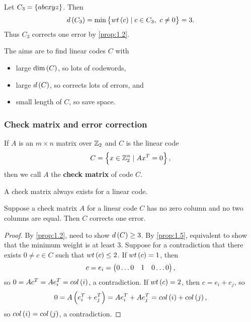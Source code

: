 \begin{example*}
Let $ C_3 = \cbr{abcxyz} $. Then
$$ d\br{C_3} = \min\cbr{wt\br{c} \mid c \in C_3, \ c \ne 0} = 3. $$
Thus $ C_3 $ corrects one error by \ref{prop:1.2}.
\end{example*}

The aims are to find linear codes $ C $ with
\begin{itemize}
\item large $ \dim\br{C} $, so lots of codewords,
\item large $ d\br{C} $, so corrects lots of errors, and
\item small length of $ C $, so save space.
\end{itemize}

\pagebreak

\subsubsection{Check matrix and error correction}

\begin{definition*}
If $ A $ is an $ m \times n $ matrix over $ \mathbb{Z}_2 $ and $ C $ is the linear code
$$ C = \cbr{x \in \Z_2^n \mid Ax^T = 0}, $$
then we call $ A $ the \textbf{check matrix} of code $ C $.
\end{definition*}

\begin{remark*}
A check matrix always exists for a linear code.
\end{remark*}

\begin{proposition}
\label{prop:1.6}
Suppose a check matrix $ A $ for a linear code $ C $ has no zero column and no two columns are equal. Then $ C $ corrects one error.
\end{proposition}

\begin{proof}
By \ref{prop:1.2}, need to show $ d\br{C} \ge 3 $. By \ref{prop:1.5}, equivalent to show that the minimum weight is at least $ 3 $. Suppose for a contradiction that there exists $ 0 \ne c \in C $ such that $ wt\br{c} \le 2 $. If $ wt\br{c} = 1 $, then
$$ c = e_i = \begin{pmatrix} 0 \dots 0 & 1 & 0 \dots 0 \end{pmatrix}, $$
so $ 0 = Ac^T = Ae_i^T = col\br{i} $, a contradiction. If $ wt\br{c} = 2 $, then $ c = e_i + e_j $, so
$$ 0 = A\br{e_i^T + e_j^T} = Ae_i^T + Ae_j^T = col\br{i} + col\br{j}, $$
so $ col\br{i} = col\br{j} $, a contradiction.
\end{proof}

